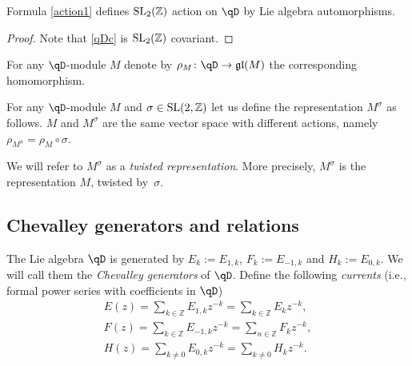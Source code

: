 \begin{Proposition} Formula \eqref{action1} defines ${\rm SL}_2 ( \mathbb{Z} )$ action on $\qD$ by Lie algebra automorphisms.
\end{Proposition}
\begin{proof} Note that \eqref{qDc} is ${\rm SL}_2 ( \mathbb{Z} )$ covariant. \end{proof}

For any $\qD$-module $M$ denote by $\rho_{M} \colon \qD \rightarrow \mathfrak{gl} (M)$ the corresponding homomorphism.

\begin{Definition} \label{twisted} For any $\qD$-module $M$ and $\sigma \in {\rm SL}(2,\mathbb{Z})$ let us define the representation $M^\sigma$ as follows. $M$ and $M^{\sigma}$ are the same vector space with different actions, namely $\rho_{M^{\sigma}} = \rho_M \circ \sigma$.
\end{Definition}

We will refer to $M^{\sigma}$ as a \emph{twisted representation}. More precisely, $M^{\sigma}$ is the representation $M$, twisted by~$\sigma$.

\subsection{Chevalley generators and relations}

The Lie algebra $\qD$ is generated by $E_k := E_{1, k}$, $F_k:=E_{-1, k}$ and $H_k := E_{0, k}$. We will call them the \emph{Chevalley generators} of $\qD$.
Define the following \emph{currents} (i.e., formal power series with coefficients in $\qD$)
\begin{gather*}
E(z) = \sum_{k \in \mathbb{Z}} E_{1,k} z^{-k} = \sum_{k \in \mathbb{Z}} E_k z^{-k},\\
F(z) = \sum_{k \in \mathbb{Z}} E_{-1, k} z^{-k} = \sum_{n \in \mathbb{Z}} F_k z^{-k},\\
H(z) = \sum_{k \neq 0} E_{0, k} z^{-k} = \sum_{k \neq 0} H_k z^{-k}.
\end{gather*}

